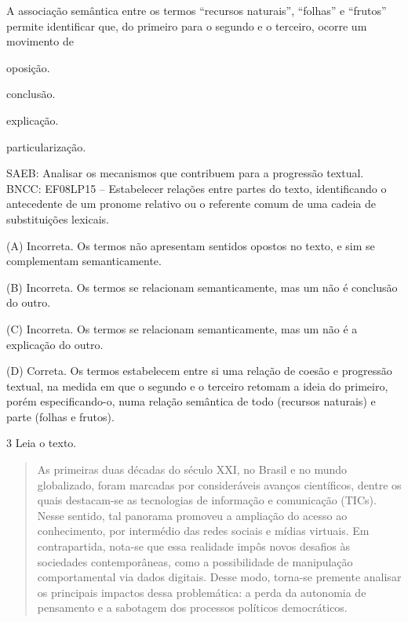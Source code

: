 
A associação semântica entre os termos ``recursos naturais'', ``folhas''
e ``frutos'' permite identificar que, do primeiro para o segundo e o
terceiro, ocorre um movimento de

\begin{escolha}
\item oposição.

\item conclusão.

\item explicação.

\item particularização.
\end{escolha}

SAEB: Analisar os mecanismos que contribuem para a progressão textual.
BNCC: EF08LP15 -- Estabelecer relações entre partes do texto,
identificando o antecedente de um pronome relativo ou o referente comum
de uma cadeia de substituições lexicais.

(A) Incorreta. Os termos não apresentam sentidos opostos no texto, e sim
se complementam semanticamente.

(B) Incorreta. Os termos se relacionam semanticamente, mas um não é
conclusão do outro.

(C) Incorreta. Os termos se relacionam semanticamente, mas um não é a
explicação do outro.

(D) Correta. Os termos estabelecem entre si uma relação de coesão e
progressão textual, na medida em que o segundo e o terceiro retomam a
ideia do primeiro, porém especificando-o, numa relação semântica de todo
(recursos naturais) e parte (folhas e frutos).

\num{3} Leia o texto.

\begin{quote}
As primeiras duas décadas do século XXI, no Brasil e no mundo
globalizado, foram marcadas por consideráveis avanços científicos,
dentre os quais destacam-se as tecnologias de informação e comunicação
(TICs). Nesse sentido, tal panorama promoveu a ampliação do acesso ao
conhecimento, por intermédio das redes sociais e mídias virtuais. Em
contrapartida, nota-se que essa realidade impôs novos desafios às
sociedades contemporâneas, como a possibilidade de manipulação
comportamental via dados digitais. Desse modo, torna-se premente
analisar os principais impactos dessa problemática: a perda da autonomia
de pensamento e a sabotagem dos processos políticos democráticos.
\end{quote}

